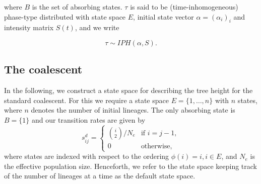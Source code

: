\documentclass[hidelinks,11pt]{article}
\begin{document}
    where $B$ is the set of absorbing states. $\tau$ is said to be (time-inhomogeneous) phase-type distributed with state space $E$, initial state vector $\alpha=(\alpha_i)_i$ and intensity matrix $S(t)$, and we write

    \begin{equation*}
        \tau \sim IPH(\alpha,S).
    \end{equation*}

    \subsection{The coalescent}\label{subsec:the-coalescent}
    In the following, we construct a state space for describing the tree height for the standard coalescent.
    For this we require a state space $E=\{1, \dots, n\}$ with $n$ states, where $n$ denotes the number of initial lineages.
    The only absorbing state is $B=\{1\}$ and our transition rates are given by
    \begin{equation*}
        s^d_{ij} = \begin{cases}
                       \binom{i}{2} / N_e & \text{if } i = j - 1, \\ 0 & \text{otherwise,}
        \end{cases}
    \end{equation*}
    where states are indexed with respect to the ordering $\phi(i) = i, i \in E$, and $N_e$ is the effective population size.
    Henceforth, we refer to the state space keeping track of the number of lineages at a time as the default state space.
\end{document}
